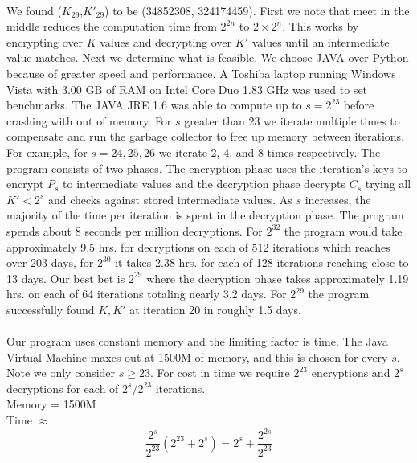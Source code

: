 \documentclass[11pt]{article}
\begin{document}
\paragraph{}
We found ($K_{29}$,$K'_{29}$) to be (34852308, 324174459). First we note
that meet in the middle reduces the computation time
from $2^{2n}$ to $2\times2^n$. This works by encrypting over
$K$ values and decrypting over $K'$ values until an intermediate value
matches. Next we determine what is feasible. We choose JAVA over Python
because of greater speed and performance. A Toshiba laptop running
Windows Vista with 3.00 GB of RAM on Intel Core Duo 1.83 GHz was used to set
benchmarks. The JAVA JRE 1.6 was able to compute up to $s = 2^{23}$ before
crashing with out of memory. For $s$ greater than 23 we iterate multiple
times to compensate and run the garbage collector to free up memory
between iterations. For example, for $s = 24,25,26$ we iterate 2, 4, and 8
times respectively. The program consists of two phases. The encryption
phase uses the iteration's keys to encrypt $P_s$ to intermediate values and the
decryption phase decrypts $C_s$ trying all $K' < 2^s$ and checks against
stored intermediate values. As $s$ increases, the majority of the time
per iteration is spent in the decryption phase. The program spends about
8 seconds per million decryptions. For $2^{32}$ the program would take
approximately 9.5 hrs. for decryptions on each of 512 iterations which reaches
over 203 days, for $2^{30}$ it takes 2.38 hrs. for each of 128
iterations reaching close to 13 days. Our best bet is $2^{29}$ where the
decryption phase takes approximately 1.19 hrs. on each of 64 iterations
totaling nearly 3.2 days. For $2^{29}$ the program successfully found
$K,K'$ at iteration 20 in roughly 1.5 days. 

\paragraph{}
Our program uses constant memory and the
limiting factor is time. The Java Virtual Machine maxes out at 1500M of
memory, and this is chosen for every $s$. Note we only consider $s \geq
23$. For cost in time we require
$2^{23}$ encryptions and $2^s$ decryptions for each of $2^s/2^{23}$ iterations. \\
Memory = 1500M \\
Time $\approx$ 
\begin{equation}
\frac{2^s}{2^{23}}(2^{23} + 2^s) = 2^s + \frac{2^{2s}}{2^{23}}
\end{equation}
\end{document}
